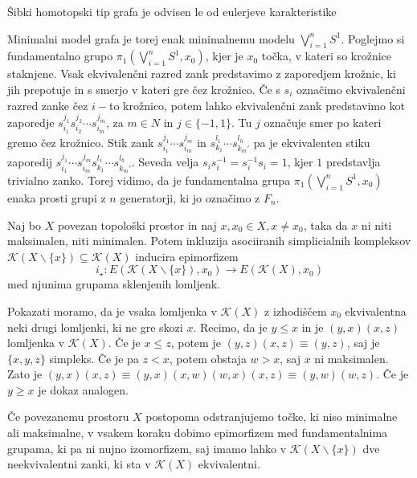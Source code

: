 \documentclass[mat1]{fmfdelo}
\DeclareRobustCommand{\k}{
    \mathcal{K}
}
\begin{document}
\begin{posledica}
    \label{pos:karakteristika}
    Šibki homotopski tip grafa je odvisen le od eulerjeve karakteristike
\end{posledica}

Minimalni model grafa je torej enak minimalnemu modelu  $\bigvee\limits_{i=1}^{n}S^1$. Poglejmo si 
fundamentalno grupo  $\pi_1(\bigvee\limits_{i=1}^{n}S^1,x_0)$, kjer je $x_0$ točka, v kateri so krožnice 
staknjene. Vsak ekvivalenčni razred zank predstavimo z zaporedjem krožnic, ki jih prepotuje in s 
smerjo v kateri gre čez krožnico. Če s $s_i$ označimo ekvivalenčni razred zanke čez $i-$to krožnico, potem lahko ekvivalenčni 
zank  predstavimo kot zaporedje $s_{i_1}^{j_1}s_{i_2}^{j_2}\cdots s_{i_m}^{j_m}$, za $m\in N$ in 
$j\in \{-1,1\}.$ Tu $j$ označuje smer po kateri gremo čez krožnico. Stik zank 
$s_{i_1}^{j_1}\cdots s_{i_m}^{j_m}$ in $s_{k_1}^{l_1}\cdots s_{k_m'}^{l_h}$ pa je ekvivalenten 
stiku zaporedij $s_{i_1}^{j_1}\cdots s_{i_m}^{j_m}s_{k_1}^{l_1}\cdots s_{k_m'}^{l_h}$.
Seveda velja $s_i s_i^{-1}=s_i^{-1}s_i=1$, kjer $1$ predstavlja trivialno zanko. 
Torej vidimo, da je fundamentalna grupa $\pi_1(\bigvee\limits_{i=1}^{n}S^1,x_0)$ enaka prosti grupi z $n$
generatorji, ki jo označimo z $F_n$.

\begin{trditev}
    Naj bo $X$ povezan topološki prostor in naj $x,x_0\in X, x\neq x_0$, taka da $x$ ni niti maksimalen, niti minimalen. Potem inkluzija asociiranih simplicialnih kompleksov $\k(X\backslash\{x\})\subseteq \k(X)$ inducira epimorfizem 
    $$
i_\star:E(\k(X\backslash\{x\}),x_0)\rightarrow E(\k(X),x_0)
    $$
    med njunima grupama sklenjenih lomljenk.
\end{trditev}

\begin{dokaz}
    Pokazati moramo, da je vsaka lomljenka v $\k(X)$ z izhodiščem $x_0$ ekvivalentna neki drugi lomljenki, ki ne gre skozi $x$.
    Recimo, da je $y\leq x$ in je $(y,x)(x,z)$ lomljenka v $\k(X)$. Če je $x\leq z$, potem je $(y,z)(x,z)\equiv(y,z)$, saj je $\{x,y,z\}$ simpleks. Če je pa $z< x$, potem obstaja $w>x$, saj $x$ ni maksimalen. Zato je $(y,x)(x,z)\equiv(y,x)(x,w)(w,x)(x,z)\equiv (y,w)(w,z)$. Če je $y\geq x$ je dokaz analogen.
\end{dokaz}

Če povezanemu prostoru $X$ postopoma odstranjujemo točke, ki niso minimalne ali maksimalne, v vsakem koraku dobimo epimorfizem med fundamentalnima grupama, ki pa ni nujno izomorfizem, saj imamo lahko v $\k(X\backslash\{x\})$ dve neekvivalentni zanki, ki sta v $\k(X)$ ekvivalentni.
\end{document}
